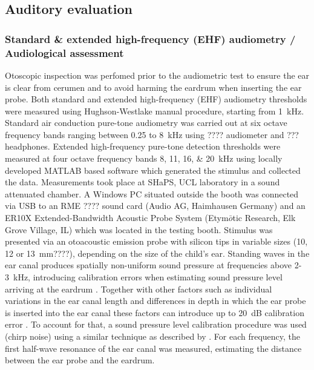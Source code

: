 \documentclass[a4paper, twoside]{templates/ociamthesis}
\begin{document}
\hypertarget{auditory-evaluation}{%
\subsection{Auditory evaluation}\label{auditory-evaluation}}

\hypertarget{standard-extended-high-frequency-ehf-audiometry-audiological-assessment}{%
\subsubsection{Standard \& extended high-frequency (EHF) audiometry / Audiological assessment}\label{standard-extended-high-frequency-ehf-audiometry-audiological-assessment}}

Otoscopic inspection was perfomed prior to the audiometric test to ensure the ear is clear from cerumen and to avoid harming the eardrum when inserting the ear probe. Both standard and extended high-frequency (EHF) audiometry thresholds were measured using Hughson-Westlake manual procedure, starting from 1~kHz. Standard air conduction pure-tone audiometry was carried out at six octave frequency bands ranging between 0.25 to 8~kHz using ???? audiometer and ??? headphones. Extended high-frequency pure-tone detection thresholds were measured at four octave frequency bands 8, 11, 16, \& 20~kHz using locally developed MATLAB based software which generated the stimulus and collected the data. Measurements took place at SHaPS, UCL laboratory in a sound attenuated chamber. A Windows PC situated outside the booth was connected via USB to an RME ???? sound card (Audio AG, Haimhausen Germany) and an ER10X Extended-Bandwidth Acoustic Probe System (Etym\(\bar{o}\)tic Research, Elk Grove Village, IL) which was located in the testing booth. Stimulus was presented via an otoacoustic emission probe with silicon tips in variable sizes (10, 12 or 13~mm????), depending on the size of the child's ear. Standing waves in the ear canal produces spatially non-uniform sound pressure at frequencies above 2-3~kHz, introducing calibration errors when estimating sound pressure level arriving at the eardrum \autocite{Siegel1994,Richmond2011,Lee2012}. Together with other factors such as individual variations in the ear canal length and differences in depth in which the ear probe is inserted into the ear canal these factors can introduce up to 20~dB calibration error \autocite{Siegel1994}. To account for that, a sound pressure level calibration procedure was used (chirp noise) using a similar technique as described by \textcite{Lee2012}. For each frequency, the first half-wave resonance of the ear canal was measured, estimating the distance between the ear probe and the eardrum.
\end{document}
